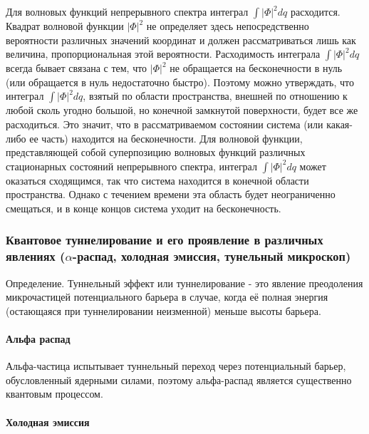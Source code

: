 Для волновых функций непрерывного спектра интеграл $\int | \Phi |^2 dq$ расходится.
Квадрат волновой функции $|\Phi|^2$ не определяет здесь непосредственно вероятности
различных значений координат и должен рассматриваться лишь как величина, пропорциональная
этой вероятности. Расходимость интеграла $\int | \Phi |^2 dq$ всегда бывает связана с тем,
что $|\Phi|^2$ не обращается на бесконечности в нуль (или обращается в нуль недостаточно
быстро). Поэтому можно утверждать, что интеграл $\int | \Phi |^2 dq$, взятый по
области пространства, внешней по отношению к любой сколь угодно большой, но конечной
замкнутой поверхности, будет все же расходиться. Это значит, что в рассматриваемом
состоянии система (или какая-либо ее часть) находится на бесконечности. Для волновой функции,
представляющей собой суперпозицию волновых функций различных стационарных состояний
непрерывного спектра, интеграл $\int |\Phi|^2 dq$ может оказаться сходящимся, так что
система находится в конечной области пространства. Однако с течением времени эта область
будет неограниченно смещаться, и в конце концов система уходит на бесконечность.


\subsubsection{Квантовое туннелирование и его проявление в различных явлениях ($\alpha$-распад, холодная эмиссия, тунельный микроскоп)}

Определение. Туннельный эффект или туннелирование - это явление преодоления микрочастицей
потенциального барьера в случае, когда её полная энергия (остающаяся при туннелировании
неизменной) меньше высоты барьера.

\paragraph{Альфа распад}
Альфа-частица испытывает туннельный переход через потенциальный барьер, обусловленный
ядерными силами, поэтому альфа-распад является существенно квантовым процессом.

\paragraph{Холодная эмиссия}


